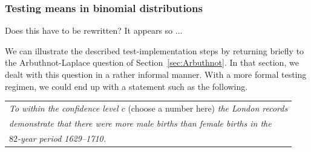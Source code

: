 \subsubsection{Testing means in binomial distributions}

{\Arny Does this have to be rewritten?  It appears so ...}

We can illustrate the described test-implementation steps by returning briefly to the Arbuthnot-Laplace question of Section~\ref{sec:Arbuthnot}.   In that section, we dealt with this question in a rather informal manner.  With a more formal testing regimen, we could end up with a statement such as the following.

\smallskip

\begin{tabular}{l}
{\em To within the confidence level $c$} (choose a number here) {\em the London records} \\
{\em demonstrate that there were more male births than female births in the} \\
{\em $82$-year period 1629--1710.}
\end{tabular}

\smallskip

